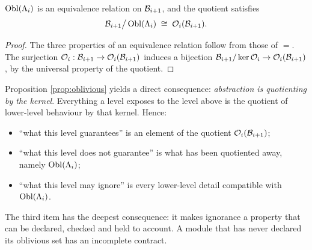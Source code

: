 \begin{proposition}\label{prop:oblivious}
$\operatorname{Obl}(\Lambda_i)$ is an equivalence relation on $\mathcal{B}_{i+1}$, and the quotient satisfies
\[
\mathcal{B}_{i+1} \big/ \operatorname{Obl}(\Lambda_i) \;\cong\; \mathcal{O}_i(\mathcal{B}_{i+1}) .
\]
\end{proposition}

\begin{proof}
The three properties of an equivalence relation follow from those of $=$. The surjection
$\mathcal{O}_i: \mathcal{B}_{i+1} \to \mathcal{O}_i(\mathcal{B}_{i+1})$ induces a bijection
$\mathcal{B}_{i+1}/\operatorname{ker}\mathcal{O}_i \to \mathcal{O}_i(\mathcal{B}_{i+1})$, by the universal property of the quotient.
\end{proof}

Proposition \ref{prop:oblivious} yields a direct consequence: \emph{abstraction is
quotienting by the kernel}. Everything a level exposes to the level above is the quotient
of lower-level behaviour by that kernel. Hence:

\begin{itemize}
\item ``what this level guarantees'' is an element of the quotient
      $\mathcal{O}_i(\mathcal{B}_{i+1})$;
\item ``what this level does not guarantee'' is what has been quotiented away, namely
      $\operatorname{Obl}(\Lambda_i)$;
\item ``what this level may ignore'' is every lower-level detail compatible with
      $\operatorname{Obl}(\Lambda_i)$.
\end{itemize}

The third item has the deepest consequence: it makes ignorance a property that can be
declared, checked and held to account. A module that has never declared its oblivious set
has an incomplete contract.

